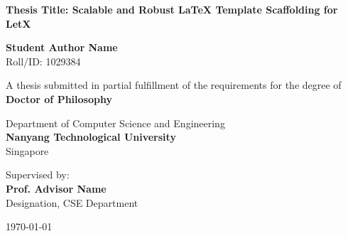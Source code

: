 \begin{titlepage}
\begin{center}
    \vspace*{1cm}
    
    
    \vspace{1.5cm}
    
    {\huge \bfseries \color{primary} Thesis Title: Scalable and Robust LaTeX Template Scaffolding for LetX}
    
    \vspace{1.5cm}
    
    {\Large \bfseries Student Author Name} \\
    \vspace{0.2cm}
    {Roll/ID: 1029384}
    
    \vspace{1.5cm}
    
    {A thesis submitted in partial fulfillment of the requirements for the degree of} \\
    \vspace{0.3cm}
    {\large \bfseries \color{secondary} Doctor of Philosophy}
    
    \vspace{1.5cm}
    
    {Department of Computer Science and Engineering} \\
    \vspace{0.2cm}
    {\large \bfseries \color{primary} Nanyang Technological University} \\
    \vspace{0.1cm}
    {Singapore}
    
    \vfill
    
    {Supervised by:} \\
    {\large \bfseries Prof. Advisor Name} \\
    {Designation, CSE Department}
    
    \vspace{1cm}
    
    {\large \today}
    
\end{center}
\end{titlepage}
